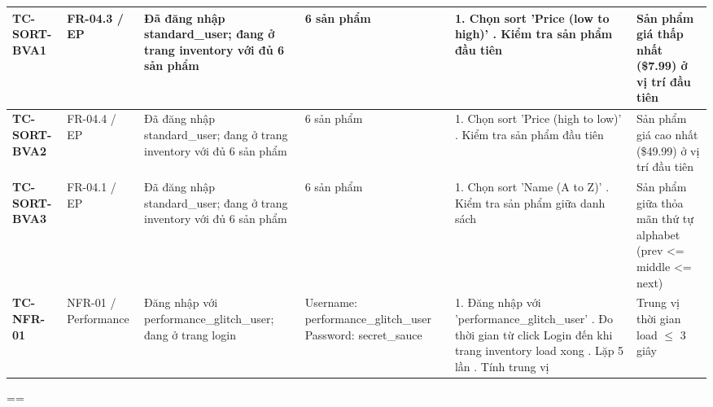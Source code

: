 {\begin{longtable}{|L{3.5cm}|L{1.9cm}|L{4.6cm}|L{3.7cm}|L{5.1cm}|L{5.1cm}|}
\hline
\textbf{\mbox{TC-SORT-BVA1}} & FR-04.3 / EP & Đã đăng nhập standard\_\allowbreak{}user; đang ở trang inventory với đủ 6 sản phẩm & 6 sản phẩm & 1. Chọn sort 'Price (low to high)' . Kiểm tra sản phẩm đầu tiên & Sản phẩm giá thấp nhất (\$7.99) ở vị trí đầu tiên \\
\hline
\textbf{\mbox{TC-SORT-BVA2}} & FR-04.4 / EP & Đã đăng nhập standard\_\allowbreak{}user; đang ở trang inventory với đủ 6 sản phẩm & 6 sản phẩm & 1. Chọn sort 'Price (high to low)' . Kiểm tra sản phẩm đầu tiên & Sản phẩm giá cao nhất (\$49.99) ở vị trí đầu tiên \\
\hline
\textbf{\mbox{TC-SORT-BVA3}} & FR-04.1 / EP & Đã đăng nhập standard\_\allowbreak{}user; đang ở trang inventory với đủ 6 sản phẩm & 6 sản phẩm & 1. Chọn sort 'Name (A to Z)' . Kiểm tra sản phẩm giữa danh sách & Sản phẩm giữa thỏa mãn thứ tự alphabet (prev <= middle <= next) \\
\hline
\textbf{\mbox{TC-NFR-01}} & NFR-01 / Performance & Đăng nhập với performance\_\allowbreak{}glitch\_\allowbreak{}user; đang ở trang login & Username: performance\_\allowbreak{}glitch\_\allowbreak{}user \newline Password: secret\_\allowbreak{}sauce & 1. Đăng nhập với 'performance\_\allowbreak{}glitch\_\allowbreak{}user' . Đo thời gian từ click Login đến khi trang inventory load xong . Lặp 5 lần . Tính trung vị & Trung vị thời gian load $\leq$ 3 giây \\
\hline
\end{longtable}
}
\clearpage
\restoregeometry
\paperwidth=21cm \paperheight=29.7cm
\pdfpagewidth=\paperwidth \pdfpageheight=\paperheight
